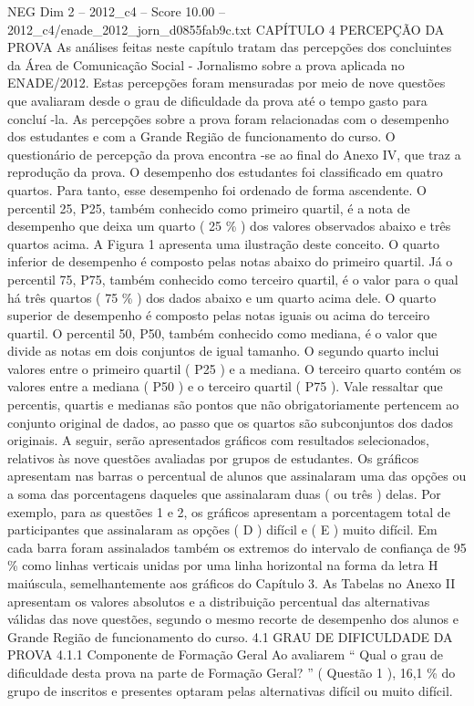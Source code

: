 \begin{textsample}{NEG Dim 2 – 2012\_c4 – Score 10.00 – 2012\_c4/enade\_2012\_jorn\_d0855fab9c.txt}  \label{ex:f2_neg_329}
CAPÍTULO 4 PERCEPÇÃO DA PROVA As análises feitas neste capítulo tratam das percepções dos concluintes da Área de Comunicação Social - Jornalismo sobre a prova aplicada no ENADE/2012.
Estas percepções foram mensuradas por meio de nove questões que avaliaram desde o grau de dificuldade da prova até o tempo gasto para concluí -la.
As percepções sobre a prova foram relacionadas com o desempenho dos estudantes e com a Grande Região de funcionamento do curso.
O questionário de percepção da prova encontra -se ao final do Anexo IV, que traz a reprodução da prova.
O desempenho dos estudantes foi classificado em quatro quartos.
Para tanto, esse desempenho foi ordenado de forma ascendente.
O percentil 25, P25, também conhecido como primeiro quartil, é a nota de desempenho que deixa um quarto ( 25 \% ) dos valores observados abaixo e três quartos acima.
A Figura 1 apresenta uma ilustração deste conceito.
O quarto inferior de desempenho é composto pelas notas abaixo do primeiro quartil.
Já o percentil 75, P75, também conhecido como terceiro quartil, é o valor para o qual há três quartos ( 75 \% ) dos dados abaixo e um quarto acima dele.
O quarto superior de desempenho é composto pelas notas iguais ou acima do terceiro quartil.
O percentil 50, P50, também conhecido como mediana, é o valor que divide as notas em dois conjuntos de igual tamanho.
O segundo quarto inclui valores entre o primeiro quartil ( P25 ) e a mediana.
O terceiro quarto contém os valores entre a mediana ( P50 ) e o terceiro quartil ( P75 ).
Vale ressaltar que percentis, quartis e medianas são pontos que não obrigatoriamente pertencem ao conjunto original de dados, ao passo que os quartos são subconjuntos dos dados originais.
A seguir, serão apresentados gráficos com resultados selecionados, relativos às nove questões avaliadas por grupos de estudantes.
Os gráficos apresentam nas barras o percentual de alunos que assinalaram uma das opções ou a soma das porcentagens daqueles que assinalaram duas ( ou três ) delas.
Por exemplo, para as questões 1 e 2, os gráficos apresentam a porcentagem total de participantes que assinalaram as opções ( D ) difícil e ( E ) muito difícil.
Em cada barra foram assinalados também os extremos do intervalo de confiança de 95 \% como linhas verticais unidas por uma linha horizontal na forma da letra H maiúscula, semelhantemente aos gráficos do Capítulo 3.
As Tabelas no Anexo II apresentam os valores absolutos e a distribuição percentual das alternativas válidas das nove questões, segundo o mesmo recorte de desempenho dos alunos e Grande Região de funcionamento do curso. 4.1 GRAU DE DIFICULDADE DA PROVA 4.1.1 Componente de Formação Geral Ao avaliarem “ Qual o grau de dificuldade desta prova na parte de Formação Geral? ” ( Questão 1 ), 16,1 \% do grupo de inscritos e presentes optaram pelas alternativas difícil ou muito difícil.

\end{textsample}
